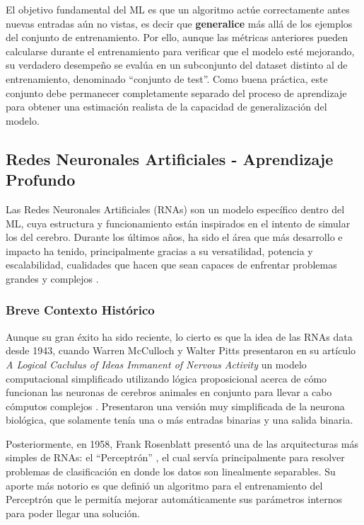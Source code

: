 \documentclass[../../main.tex]{subfiles}
\begin{document}
El objetivo fundamental del ML es que un algoritmo actúe correctamente antes nuevas entradas aún no vistas, es decir que \textbf{generalice} más allá de los ejemplos del conjunto de entrenamiento. Por ello, aunque las métricas anteriores pueden calcularse durante el entrenamiento para verificar que el modelo esté mejorando, su verdadero desempeño se evalúa en un subconjunto del dataset distinto al de entrenamiento, denominado ``conjunto de test''. Como buena práctica, este conjunto debe permanecer completamente separado del proceso de aprendizaje para obtener una estimación realista de la capacidad de generalización del modelo.

\subsection{Redes Neuronales Artificiales - Aprendizaje Profundo}
Las Redes Neuronales Artificiales (RNAs) son un modelo específico dentro del ML, cuya estructura y funcionamiento están inspirados en el intento de simular los del cerebro. Durante los últimos años, ha sido el área que más desarrollo e impacto ha tenido, principalmente gracias a su versatilidad, potencia y escalabilidad, cualidades que hacen que sean capaces de enfrentar problemas grandes y complejos \cite{hands-on-ML-sklearn-tf}.

\subsubsection{Breve Contexto Histórico}
Aunque su gran éxito ha sido reciente, lo cierto es que la idea de las RNAs data desde 1943, cuando Warren McCulloch y Walter Pitts presentaron en su artículo \textit{A Logical Caclulus of Ideas Immanent of Nervous Activity} \cite{mculloch-pitts-1943} un modelo computacional simplificado utilizando lógica proposicional acerca de cómo funcionan las neuronas de cerebros animales en conjunto para llevar a cabo cómputos complejos \cite{hands-on-ML-sklearn-tf}. Presentaron una versión muy simplificada de la neurona biológica, que solamente tenía una o más entradas binarias y una salida binaria.

Posteriormente, en 1958, Frank Rosenblatt presentó una de las arquitecturas más simples de RNAs: el ``Perceptrón'' \cite{rosenblatt1958perceptron}, el cual servía principalmente para resolver problemas de clasificación en donde los datos son linealmente separables. Su aporte más notorio es que definió un algoritmo para el entrenamiento del Perceptrón que le permitía mejorar automáticamente sus parámetros internos para poder llegar una solución.
\end{document}
